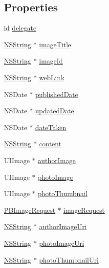 \subsection*{Properties}
\begin{DoxyCompactItemize}
\item 
id \hyperlink{interface_p_b_image_a8d9332fcd23523b1e2520b8765577423}{delegate}
\item 
\hyperlink{class_n_s_string}{NSString} $\ast$ \hyperlink{interface_p_b_image_ab2b75fc62ad2bd0851e3dbc23970e861}{imageTitle}
\item 
\hyperlink{class_n_s_string}{NSString} $\ast$ \hyperlink{interface_p_b_image_aa261fc22d796a74fe41c14b28e08b30b}{imageId}
\item 
\hyperlink{class_n_s_string}{NSString} $\ast$ \hyperlink{interface_p_b_image_ad8ac8644eb2e6a0a2b963a0242235562}{webLink}
\item 
NSDate $\ast$ \hyperlink{interface_p_b_image_a7c9e348da15c9c34c347bcc1bafd6fa2}{publishedDate}
\item 
NSDate $\ast$ \hyperlink{interface_p_b_image_ad3d43ed4d30cf7a94aea5bd5ae7e0671}{updatedDate}
\item 
NSDate $\ast$ \hyperlink{interface_p_b_image_aec17cd0d68172718dfac2208e2f104cd}{dateTaken}
\item 
\hyperlink{class_n_s_string}{NSString} $\ast$ \hyperlink{interface_p_b_image_a8442f36d5bc844633edba74b62ce2990}{content}
\item 
UIImage $\ast$ \hyperlink{interface_p_b_image_a71aa8412f076c05a16d5244586dc7955}{authorImage}
\item 
UIImage $\ast$ \hyperlink{interface_p_b_image_acc01abe6ae58d15eb68d6f8982922eb0}{photoImage}
\item 
UIImage $\ast$ \hyperlink{interface_p_b_image_a246f847f78ea171cf4cce2e6dda32725}{photoThumbnail}
\item 
\hyperlink{interface_p_b_image_request}{PBImageRequest} $\ast$ \hyperlink{interface_p_b_image_ae1353071f99808617f8d3726ebc0db95}{imageRequest}
\item 
\hyperlink{class_n_s_string}{NSString} $\ast$ \hyperlink{interface_p_b_image_ad3d1904f67220f320f88ad5b6a9714ef}{authorImageUri}
\item 
\hyperlink{class_n_s_string}{NSString} $\ast$ \hyperlink{interface_p_b_image_afd02dd84e4335a88dfb40fa243268f85}{photoImageUri}
\item 
\hyperlink{class_n_s_string}{NSString} $\ast$ \hyperlink{interface_p_b_image_a68ff9e3c26d377921ce02942d15f7fbb}{photoThumbnailUri}
\end{DoxyCompactItemize}


